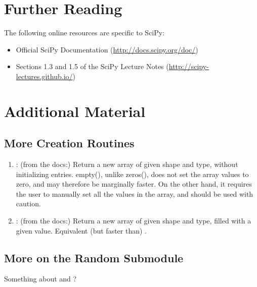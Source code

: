 \section*{Further Reading}
The following online resources are specific to SciPy:
\begin{itemize}
\item Official SciPy Documentation (\url{http://docs.scipy.org/doc/})
\item Sections 1.3 and 1.5 of the SciPy Lecture Notes (\url{http://scipy-lectures.github.io/})
\end{itemize}

\newpage

\section*{Additional Material}

\subsection*{More Creation Routines}

\begin{enumerate}
\item {}: (from the docs:) Return a new array of given shape and type, without initializing entries. empty(), unlike zeros(), does not set the array values to zero, and may therefore be marginally faster. On the other hand, it requires the user to manually set all the values in the array, and should be used with caution.
\item {}: (from the docs:) Return a new array of given shape and type, filled with a given value. Equivalent (but faster than) .
\end{enumerate}

\subsection*{More on the Random Submodule}

Something about  and  ?
